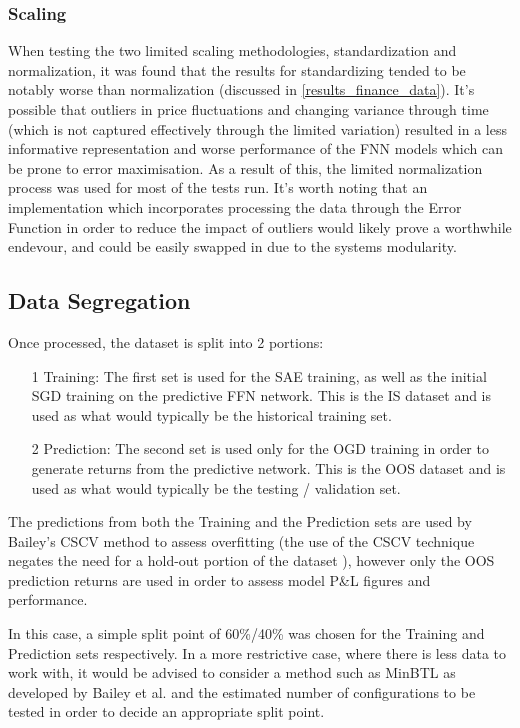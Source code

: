 \documentclass[a4paper,11pt,oneside]{article}
\theoremstyle{plain}
\theoremstyle{definition}
\begin{document}
	
	
	\subsubsection {Scaling} When testing the two limited scaling methodologies, standardization and normalization, it was found that the results for standardizing tended to be notably worse than normalization (discussed in \ref{results_finance_data}). It's possible that outliers in price fluctuations and changing variance through time (which is not captured effectively through the limited variation) resulted in a less informative representation and worse performance of the FNN models which can be prone to error maximisation. As a result of this, the limited normalization process was used for most of the tests run. It's worth noting that an implementation which incorporates processing the data through the Error Function in order to reduce the impact of outliers would likely prove a worthwhile endevour, and could be easily swapped in due to the systems modularity.\newline
	
	
	\subsection{Data Segregation}\label{proc_dataseg}
	
	Once processed, the dataset is split into 2 portions: 
	\begin{itemize}
		\item[1] Training: The first set is used for the SAE training, as well as the initial SGD training on the predictive FFN network. This is the IS dataset and is used as what would typically be the historical training set.
		\item[2] Prediction: The second set is used only for the OGD training in order to generate returns from the predictive network. This is the OOS dataset and is used as what would typically be the testing / validation set.
	\end{itemize}
	
	The predictions from both the Training and the Prediction sets are used by Bailey's CSCV method to assess overfitting (the use of the CSCV technique negates the need for a hold-out portion of the dataset \cite{BailyPBO}), however only the OOS prediction returns are used in order to assess model P\&L figures and performance. \newline
	
	In this case, a simple split point of 60\%/40\% was chosen for the Training and Prediction sets respectively. In a more restrictive case, where there is less data to work with, it would be advised to consider a method such as MinBTL as developed by Bailey et al. \cite{BaileyBTL} and the estimated number of configurations to be tested in order to decide an appropriate split point.
	
\end{document}

